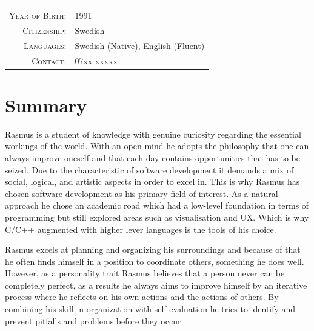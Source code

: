 \documentclass[a4paper,10pt]{article}
\begin{document}
\begin{tabular}{rl}
    \textsc{} &    \\
    \textsc{Year of Birth:} &   1991   \\
    \textsc{Citizenship:}   &   Swedish \\ 
    \textsc{Languages:}  & Swedish (Native), English (Fluent) \\
    \textsc{Contact:}   & 07xx-xxxxx \\
\end{tabular}

\section{Summary}
Rasmus is a student of knowledge with genuine curiosity regarding the essential workings of the world. With an open mind he adopts the philosophy that one can always improve oneself and that each day contains opportunities that has to be seized. Due to the characteristic of software development it demands a mix of social, logical, and artistic aspects in order to excel
in. This is why Rasmus has chosen software development as his primary field of interest. As a natural approach he chose an academic road which had a low-level foundation in terms of programming but still explored areas such as visualisation and UX. Which is why C/C++ augmented with higher lever languages is the tools of his choice.

Rasmus excels at planning and organizing his surroundings and because of that he often finds himself in a position to
coordinate others, something he does well. However, as a personality trait Rasmus believes that a person never can be
completely perfect, as a results he always aims to improve himself by an iterative process where he reflects on his own
actions and the actions of others. By combining his skill in organization with self evaluation he tries to identify and
prevent pitfalls and problems before they occur

\end{document}
